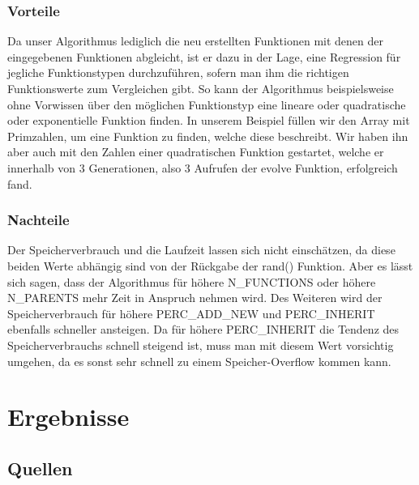 \documentclass[a4paper,12pt]{article}
\begin{document}
\subsubsection{Vorteile}
Da unser Algorithmus lediglich die neu erstellten Funktionen mit denen der eingegebenen Funktionen abgleicht, ist er dazu in der Lage, eine Regression für jegliche Funktionstypen durchzuführen, sofern man ihm die richtigen Funktionswerte zum Vergleichen gibt. So kann der Algorithmus beispielsweise ohne Vorwissen über den möglichen Funktionstyp eine lineare oder quadratische oder exponentielle Funktion finden. In unserem Beispiel füllen wir den Array mit Primzahlen, um eine Funktion zu finden, welche diese beschreibt. Wir haben ihn aber auch mit den Zahlen einer quadratischen Funktion gestartet, welche er innerhalb von 3 Generationen, also 3 Aufrufen der evolve Funktion, erfolgreich fand. \\

\subsubsection{Nachteile}
Der Speicherverbrauch und die Laufzeit lassen sich nicht einschätzen, da diese beiden Werte abhängig sind von der Rückgabe der rand() Funktion. Aber es lässt sich sagen, dass der Algorithmus für höhere N\_FUNCTIONS oder höhere N\_PARENTS mehr Zeit in Anspruch nehmen wird. Des Weiteren wird der Speicherverbrauch für höhere PERC\_ADD\_NEW und PERC\_INHERIT ebenfalls schneller ansteigen. Da für höhere PERC\_INHERIT die Tendenz des Speicherverbrauchs schnell steigend ist, muss man mit diesem Wert vorsichtig umgehen, da es sonst sehr schnell zu einem Speicher-Overflow kommen kann. 

\section{Ergebnisse}


\begin{appendix}
\section{Quellen}
\end{appendix}
\end{document}
